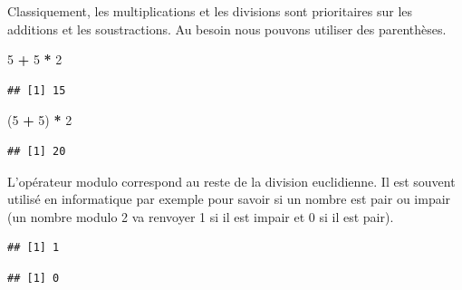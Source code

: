 \documentclass[]{book}
\newenvironment{Shaded}{\begin{snugshade}}{\end{snugshade}}
\newcommand{\DecValTok}[1]{\textcolor[rgb]{0.00,0.00,0.81}{#1}}
\newcommand{\StringTok}[1]{\textcolor[rgb]{0.31,0.60,0.02}{#1}}
\newcommand{\OperatorTok}[1]{\textcolor[rgb]{0.81,0.36,0.00}{\textbf{#1}}}
\newcommand{\NormalTok}[1]{#1}
\begin{document}
Classiquement, les multiplications et les divisions sont prioritaires
sur les additions et les soustractions. Au besoin nous pouvons utiliser
des parenthèses.

\begin{Shaded}
\begin{Highlighting}[]
\DecValTok{5} \OperatorTok{+}\StringTok{ }\DecValTok{5} \OperatorTok{*}\StringTok{ }\DecValTok{2}
\end{Highlighting}
\end{Shaded}

\begin{verbatim}
## [1] 15
\end{verbatim}

\begin{Shaded}
\begin{Highlighting}[]
\NormalTok{(}\DecValTok{5} \OperatorTok{+}\StringTok{ }\DecValTok{5}\NormalTok{) }\OperatorTok{*}\StringTok{ }\DecValTok{2}
\end{Highlighting}
\end{Shaded}

\begin{verbatim}
## [1] 20
\end{verbatim}

L'opérateur modulo correspond au reste de la division euclidienne. Il
est souvent utilisé en informatique par exemple pour savoir si un nombre
est pair ou impair (un nombre modulo 2 va renvoyer 1 si il est impair et
0 si il est pair).

\begin{Shaded}
\end{Shaded}

\begin{verbatim}
## [1] 1
\end{verbatim}

\begin{Shaded}
\end{Shaded}

\begin{verbatim}
## [1] 0
\end{verbatim}

\begin{Shaded}
\end{Shaded}
\end{document}
